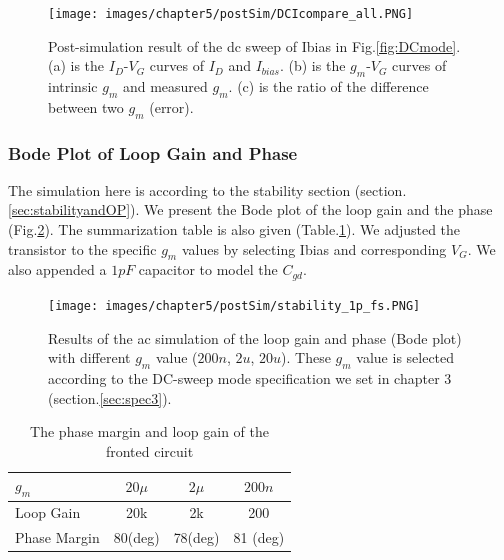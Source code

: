 {\begin{figure}[!htbp]
    \centering
        \texttt{[image: images/chapter5/postSim/DCIcompare\_all.PNG]}
    \caption{Post-simulation result of the dc sweep of Ibias in Fig.\ref{fig:DCmode}. (a) is the $I_D$-$V_G$ curves of $I_D$ and $I_{bias}$. (b) is the $g_m$-$V_G$ curves of intrinsic $g_m$ and measured $g_m$. (c) is the ratio of the difference between two $g_m$ (error).}
    \label{fig:sim:DCIcompare}
\end{figure}

\subsubsection{Bode Plot of Loop Gain and Phase}
The simulation here is according to the stability section (section.\ref{sec:stabilityandOP}).
We present the Bode plot of the loop gain and the phase (Fig.\ref{fig:sim:loopsim}).
The summarization table is also given (Table.\ref{tb:1staACsim}).
We adjusted the transistor to the specific $g_m$ values by selecting Ibias and corresponding $V_G$.
We also appended a $1pF$ capacitor to model the $C_{gd}$.


\begin{figure}[!htb]
    \centering
        \texttt{[image: images/chapter5/postSim/stability\_1p\_fs.PNG]}
    \caption{Results of the ac simulation of the loop gain and phase (Bode plot) with different $g_m$ value ($200n$, $2u$, $20u$). These $g_m$ value is selected according to the DC-sweep mode specification we set in chapter 3 (section.\ref{sec:spec3}).}
    \label{fig:sim:loopsim}
\end{figure}


\begin{table}[!bht]
    {\fontfamily{}\fontsize{10}{14}\selectfont
    \centering
    \begin{tabular}{l|c|c|c}
        $g_m$ & $20\mu$ & $2\mu$ & $200n$\\
        \hline
        Loop Gain & 20k & 2k & 200\\
        \hline
        Phase Margin & 80(deg) & 78(deg) & 81 (deg) \\
    \end{tabular}
    \caption{The phase margin and loop gain of the fronted circuit}
    \label{tb:1staACsim}
    }
\end{table}



}
